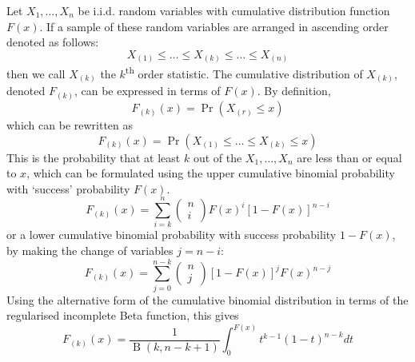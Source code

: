 \documentclass[11pt]{report} %
\begin{document}
Let $X_{1}, \dots, X_{n}$ be i.i.d. random variables with cumulative distribution function $F\left(x\right)$. If a sample of these random variables are arranged in ascending order denoted as follows:
\begin{equation}
X_{\left(1\right)} \leq \dots \leq X_{\left(k\right)} \leq \dots \leq X_{\left(n\right)}
\end{equation}
then we call $X_{\left(k\right)}$ the $k$\textsuperscript{th} order statistic. The cumulative distribution of $X_{\left(k\right)}$, denoted $F_{\left(k\right)}$, can be expressed in terms of $F\left(x\right)$. By definition,
\begin{equation}
F_{\left(k\right)}\left(x\right) = \operatorname{Pr}\left(X_{\left(r\right)} \leq x\right)
\end{equation}
which can be rewritten as
\begin{equation}
F_{\left(k\right)}\left(x\right) = \operatorname{Pr}\left(X_{\left(1\right)} \leq \dots \leq X_{\left(k\right)} \leq x\right)
\end{equation}
This is the probability that at least $k$ out of the $X_{1}, \dots, X_{n}$ are less than or equal to $x$, which can be formulated using the upper cumulative binomial probability with `success' probability $F\left(x\right)$.
\begin{equation}
F_{\left(k\right)}\left(x\right) = \sum_{i = k}^{n}\begin{pmatrix}n \\ i\end{pmatrix}F\left(x\right)^{i}\left[1 - F\left(x\right)\right]^{n - i}
\end{equation}
or a lower cumulative binomial probability with success probability $1 - F\left(x\right)$, by making the change of variables $j = n - i$:
\begin{equation}
F_{\left(k\right)}\left(x\right) = \sum_{j = 0}^{n - k}\begin{pmatrix}n \\ j\end{pmatrix}\left[1 - F\left(x\right)\right]^{j}F\left(x\right)^{n - j}
\end{equation}
Using the alternative form of the cumulative binomial distribution in terms of the regularised incomplete Beta function, this gives
\begin{equation}
F_{\left(k\right)}\left(x\right) = \dfrac{1}{\operatorname{B}\left(k, n - k + 1\right)}\int_{0}^{F\left(x\right)}t^{k - 1}\left(1 - t\right)^{n - k}dt
\end{equation}
\end{document}
